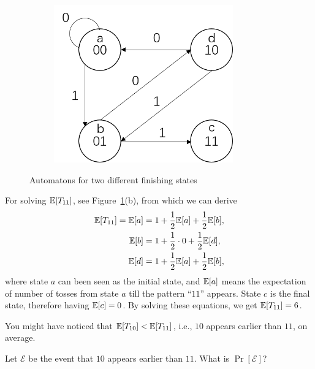 \documentclass[12pt,a4]{article}
\begin{document}
\begin{solution}
\begin{enumerate}
\begin{figure}[htbp]
\begin{subfigure}{.5\textwidth}
             \includegraphics[width=0.85\textwidth]{figures/Fig-3-1b.PNG}
             \caption{}
         \end{subfigure}
         \caption{Automatons for two different finishing states}\label{Fig-3.1}
     \end{figure}
     
     For solving $\mathbb{E}[T_{11}]$, see Figure~\ref{Fig-3.1}(b), from which we can derive
         \begin{align*}
            \mathbb{E}[T_{11}]=\mathbb{E}[a]&=1+\frac{1}{2}\mathbb{E}[a]+\frac{1}{2}\mathbb{E}[b],\\
            \mathbb{E}[b]&=1+\frac{1}{2}\cdot0+\frac{1}{2}\mathbb{E}[d],\\
            \mathbb{E}[d]&=1+\frac{1}{2}\mathbb{E}[a]+\frac{1}{2}\mathbb{E}[b],
         \end{align*}
         where state $a$ can been seen as the initial state, and $\mathbb{E}[a]$ means the expectation of number of tosses from state $a$ till the pattern ``$11$'' appears. State $c$ is the final state, therefore having $\mathbb{E}[c]=0$. By solving these equations, we get $\mathbb{E}[T_{11}]=6$.
      \end{enumerate}
   \end{solution}

You might have noticed that $\mathbb{E}[T_{10}] < \mathbb{E}[T_{11}]$, i.e., $10$ appears earlier than $11$, on average.
\begin{exercise}
   Let $\mathcal{E}$ be the event that $10$ appears earlier than $11$. What is $\Pr[\mathcal{E}]$?
\end{exercise}
\end{document}
